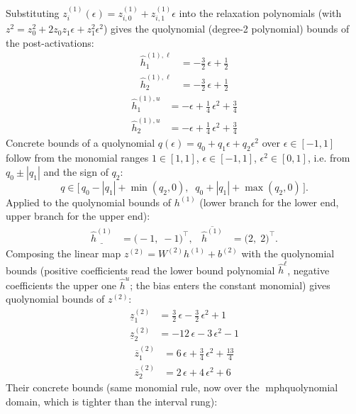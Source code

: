 \documentclass[11pt]{article}
\begin{document}
Substituting $z^{(1)}_i(\epsilon) = z^{(1)}_{i,0} + z^{(1)}_{i,1} \epsilon$ into the relaxation
polynomials (with $z^2 = z_0^2 + 2 z_0 z_1 \epsilon + z_1^2 \epsilon^2$) gives the quolynomial
(degree-2 polynomial) bounds of the post-activations:
\begin{align*}
\hat{h}^{(1),\ell}_{1} &= -\frac{3}{2}\,\epsilon + \frac{1}{2} \\
\hat{h}^{(1),\ell}_{2} &= -\frac{3}{2}\,\epsilon + \frac{1}{2}
\end{align*}
\begin{align*}
\hat{h}^{(1),u}_{1} &= -\epsilon + \frac{1}{4}\,\epsilon^2 + \frac{3}{4} \\
\hat{h}^{(1),u}_{2} &= -\epsilon + \frac{1}{4}\,\epsilon^2 + \frac{3}{4}
\end{align*}
Concrete bounds of a quolynomial $q(\epsilon) = q_0 + q_1 \epsilon + q_2 \epsilon^2$ over
$\epsilon \in [-1, 1]$ follow from the monomial ranges $1 \in [1, 1]$, $\epsilon \in [-1, 1]$,
$\epsilon^2 \in [0, 1]$, i.e. from $q_0 \pm |q_1|$ and the sign of $q_2$:
\begin{equation*}
q \in \bigl[\, q_0 - |q_1| + \min(q_2, 0), \;\; q_0 + |q_1| + \max(q_2, 0) \,\bigr].
\end{equation*}
Applied to the quolynomial bounds of $h^{(1)}$ (lower branch for the lower end, upper branch for the upper end):
\begin{align*}
\underline{\hat{h}^{(1)}} &= \bigl(-1,\; -1\bigr)^{\!\top}, & \overline{\hat{h}^{(1)}} &= \bigl(2,\; 2\bigr)^{\!\top}.
\end{align*}
Composing the linear map $z^{(2)} = W^{(2)} h^{(1)} + b^{(2)}$ with the quolynomial bounds
(positive coefficients read the lower bound polynomial $\hat{h}^{\ell}$, negative coefficients the
upper one $\hat{h}^{u}$; the bias enters the constant monomial) gives quolynomial bounds of
$z^{(2)}$:
\begin{align*}
\underline{z}^{(2)}_{1} &= \frac{3}{2}\,\epsilon - \frac{3}{2}\,\epsilon^2 + 1 \\
\underline{z}^{(2)}_{2} &= -12\,\epsilon - 3\,\epsilon^2 - 1
\end{align*}
\begin{align*}
\overline{z}^{(2)}_{1} &= 6\,\epsilon + \frac{3}{4}\,\epsilon^2 + \frac{13}{4} \\
\overline{z}^{(2)}_{2} &= 2\,\epsilon + 4\,\epsilon^2 + 6
\end{align*}
Their concrete bounds (same monomial rule, now over the mph{quolynomial} domain, which is tighter than the interval rung):
\end{document}
